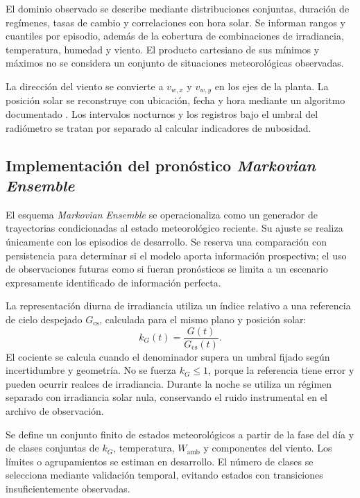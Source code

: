 El dominio observado se describe mediante distribuciones conjuntas, duración de regímenes, tasas de cambio y correlaciones con hora solar. Se informan rangos y cuantiles por episodio, además de la cobertura de combinaciones de irradiancia, temperatura, humedad y viento. El producto cartesiano de sus mínimos y máximos no se considera un conjunto de situaciones meteorológicas observadas.

La dirección del viento se convierte a $v_{w,x}$ y $v_{w,y}$ en los ejes de la planta. La posición solar se reconstruye con ubicación, fecha y hora mediante un algoritmo documentado \cite{reda2004}. Los intervalos nocturnos y los registros bajo el umbral del radiómetro se tratan por separado al calcular indicadores de nubosidad.

\subsection{Implementación del pronóstico \textit{Markovian Ensemble}}
\label{met:markov}

El esquema \textit{Markovian Ensemble} se operacionaliza como un generador de trayectorias condicionadas al estado meteorológico reciente. Su ajuste se realiza únicamente con los episodios de desarrollo. Se reserva una comparación con persistencia para determinar si el modelo aporta información prospectiva; el uso de observaciones futuras como si fueran pronósticos se limita a un escenario expresamente identificado de información perfecta.

La representación diurna de irradiancia utiliza un índice relativo a una referencia de cielo despejado $G_{\mathrm{cs}}$, calculada para el mismo plano y posición solar:
\begin{equation}
k_G(t)=\frac{G(t)}{G_{\mathrm{cs}}(t)}.
\label{met:indice_cielo}
\end{equation}
El cociente se calcula cuando el denominador supera un umbral fijado según incertidumbre y geometría. No se fuerza $k_G\leq1$, porque la referencia tiene error y pueden ocurrir realces de irradiancia. Durante la noche se utiliza un régimen separado con irradiancia solar nula, conservando el ruido instrumental en el archivo de observación.

Se define un conjunto finito de estados meteorológicos a partir de la fase del día y de clases conjuntas de $k_G$, temperatura, $W_{\mathrm{amb}}$ y componentes del viento. Los límites o agrupamientos se estiman en desarrollo. El número de clases se selecciona mediante validación temporal, evitando estados con transiciones insuficientemente observadas.

